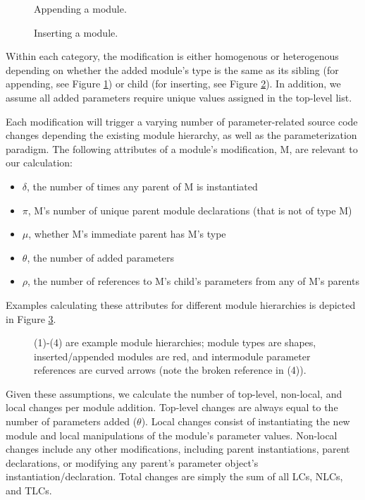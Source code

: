 \begin{figure}
\centering
{}
\caption{Appending a module.}
\label{fig:hc}
\end{figure}

\begin{figure}
\centering
{}
\caption{Inserting a module.}
\label{fig:vc}
\end{figure}

Within each category, the modification is either homogenous or heterogenous depending on whether the added module's type is the same as its sibling (for appending, see Figure \ref{fig:hc}) or child (for inserting, see Figure \ref{fig:vc}). In addition, we assume all added parameters require unique values assigned in the top-level list.

Each modification will trigger a varying number of parameter-related source code changes depending the existing module hierarchy, as well as the parameterization paradigm. The following attributes of a module's modification, M, are relevant to our calculation:

\begin{itemize}\itemsep1pt \parskip0pt 
\item $\delta$, the number of times any parent of M is instantiated
\item $\pi$, M's number of unique parent module declarations (that is not of type M)
\item $\mu$, whether M's immediate parent has M's type
\item $\theta$, the number of added parameters
\item $\rho$, the number of references to M's child's parameters from any of M's parents
\end{itemize}

Examples calculating these attributes for different module hierarchies is depicted in Figure \ref{fig:attr}.

\begin{figure}
\centering
{}
\caption{(1)-(4) are example module hierarchies; module types are shapes, inserted/appended modules are red, and intermodule parameter references are curved arrows (note the broken reference in (4)).}
\label{fig:attr}
\setlength{\belowcaptionskip}{-20pt}
\end{figure}

Given these assumptions, we calculate the number of top-level, non-local, and local changes per module addition. Top-level changes are always equal to the number of parameters added ($\theta$). Local changes consist of instantiating the new module and local manipulations of the module's parameter values. Non-local changes include any other modifications, including parent instantiations, parent declarations, or modifying any parent's parameter object's instantiation/declaration. Total changes are simply the sum of all LCs, NLCs, and TLCs.

